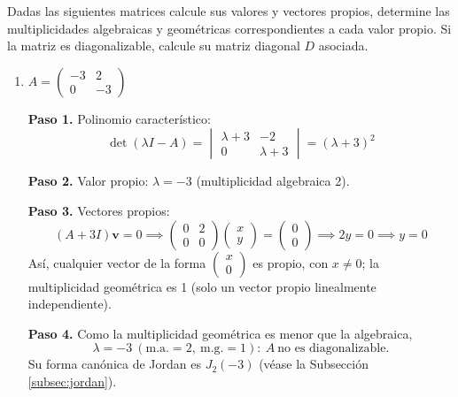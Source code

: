 

\begin{prob}
Dadas las siguientes matrices calcule sus valores y vectores propios, determine las multiplicidades algebraicas y geométricas correspondientes a cada valor propio. Si la matriz es diagonalizable, calcule su matriz diagonal $D$ asociada.

\begin{enumerate}[$a)$]

\item $A=\left(\begin{matrix}
-3 & 2 \\ 0 & -3
\end{matrix}\right)$

\begin{myproof}
\textbf{Paso 1.} Polinomio característico:
\[
\det(\lambda I - A) = \begin{vmatrix} \lambda+3 & -2 \\ 0 & \lambda+3 \end{vmatrix} = (\lambda+3)^2
\]

\textbf{Paso 2.} Valor propio: $\lambda = -3$ (multiplicidad algebraica 2).

\textbf{Paso 3.} Vectores propios:
\[
(A + 3I)\mathbf{v} = 0 \implies \begin{pmatrix} 0 & 2 \\ 0 & 0 \end{pmatrix} \begin{pmatrix} x \\ y \end{pmatrix} = \begin{pmatrix} 0 \\ 0 \end{pmatrix} \implies 2y=0 \implies y=0
\]
Así, cualquier vector de la forma $\begin{pmatrix} x \\ 0 \end{pmatrix}$ es propio, con $x\neq 0$; la multiplicidad geométrica es 1 (solo un vector propio linealmente independiente).

\textbf{Paso 4.} Como la multiplicidad geométrica es menor que la algebraica,
\[
\boxed{\lambda=-3\ (\text{m.a.}=2,\ \text{m.g.}=1):\ A\ \text{no es diagonalizable}.}
\]
Su forma canónica de Jordan es $J_2(-3)$ (véase la Subsección \ref{subsec:jordan}).
\end{myproof}


\end{enumerate}
\end{prob}
